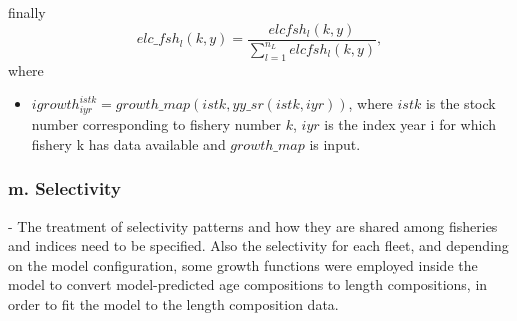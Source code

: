 \documentclass{article}
\begin{document}
finally
\begin{equation}
elc\_fsh_l(k,y)=\dfrac{elcfsh_l(k,y)}{\displaystyle\sum_{l=1}^{n_L} elcfsh_l(k,y)},
\end{equation}
where
\begin{itemize}
    \item $igrowth^{istk}_{iyr}=growth\_map(istk,yy\_sr(istk,iyr))$, where $istk$ is the stock number corresponding to fishery number $k$, $iyr$ is the index year i for which fishery k has data available and $growth\_map$ is input.
\end{itemize}

\subsubsection{m. Selectivity}
- The treatment of selectivity patterns and how they are shared among fisheries and indices need to be specified. Also the selectivity for each fleet, and depending on the model configuration, some growth functions were employed inside the model to convert model-predicted age compositions to length compositions, in order to fit the model to the length composition data.\\
\end{document}
